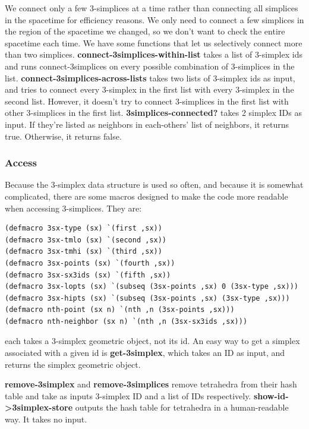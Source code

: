 \documentclass[12pt]{article}
\begin{document}
We connect only a few 3-simplices at a time rather than connecting all
simplices in the spacetime for efficiency reasons. We only need to
connect a few simplices in the region of the spacetime we changed, so
we don't want to check the entire spacetime each time. We have some
functions that let us selectively connect more than two
simplices. \textbf{connect-3simplices-within-list} takes a list of
3-simplex ids and runs connect-3simplices on every possible
combination of 3-simplices in the
list. \textbf{connect-3simplices-across-lists} takes two lists of
3-simplex ids as input, and tries to connect every 3-simplex in the
first list with every 3-simplex in the second list. However, it
doesn't try to connect 3-simplices in the first list with other
3-simplices in the first list. \textbf{3simplices-connected?} takes 2
simplex IDs as input. If they're listed as neighbors in each-others'
list of neighbors, it returns true. Otherwise, it returns false.

\subsubsection{Access}
\label{s:d:tetrahedra:access}
Because the 3-simplex data structure is used so often, and because it
is somewhat complicated, there are some macros designed to make the
code more readable when accessing 3-simplices. They are:
\begin{small}
\begin{lstlisting}
(defmacro 3sx-type (sx) `(first ,sx))
(defmacro 3sx-tmlo (sx) `(second ,sx))
(defmacro 3sx-tmhi (sx) `(third ,sx))
(defmacro 3sx-points (sx) `(fourth ,sx))
(defmacro 3sx-sx3ids (sx) `(fifth ,sx))
(defmacro 3sx-lopts (sx) `(subseq (3sx-points ,sx) 0 (3sx-type ,sx)))
(defmacro 3sx-hipts (sx) `(subseq (3sx-points ,sx) (3sx-type ,sx)))
(defmacro nth-point (sx n) `(nth ,n (3sx-points ,sx)))
(defmacro nth-neighbor (sx n) `(nth ,n (3sx-sx3ids ,sx)))
\end{lstlisting}
\end{small}
each takes a 3-simplex geometric object, not its id. An easy way to
get a simplex associated with a given id is \textbf{get-3simplex},
which takes an ID as input, and returns the simplex geometric
object. 

\textbf{remove-3simplex} and \textbf{remove-3simplices} remove
tetrahedra from their hash table and take as inputs 3-simplex ID and a
list of IDs respectively. \textbf{show-id->3simplex-store} outputs the
hash table for tetrahedra in a human-readable way. It takes no input. 
\end{document}
